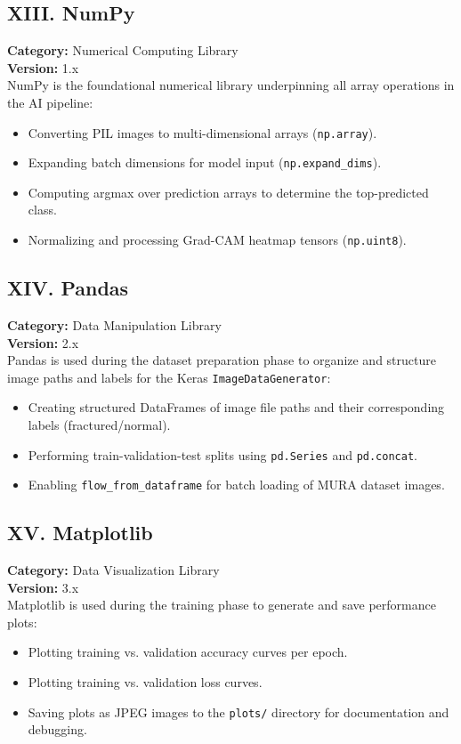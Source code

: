 \documentclass[a4paper,12pt]{report}
\begin{document}
    \subsection*{XIII. NumPy}
    \textbf{Category:} Numerical Computing Library\\
    \textbf{Version:} 1.x\\
    NumPy is the foundational numerical library underpinning all array operations in the AI pipeline:
    \begin{itemize}
        \item Converting PIL images to multi-dimensional arrays (\texttt{np.array}).
        \item Expanding batch dimensions for model input (\texttt{np.expand\_dims}).
        \item Computing argmax over prediction arrays to determine the top-predicted class.
        \item Normalizing and processing Grad-CAM heatmap tensors (\texttt{np.uint8}).
    \end{itemize}

    \subsection*{XIV. Pandas}
    \textbf{Category:} Data Manipulation Library\\
    \textbf{Version:} 2.x\\
    Pandas is used during the dataset preparation phase to organize and structure image paths and labels for the Keras \texttt{ImageDataGenerator}:
    \begin{itemize}
        \item Creating structured DataFrames of image file paths and their corresponding labels (fractured/normal).
        \item Performing train-validation-test splits using \texttt{pd.Series} and \texttt{pd.concat}.
        \item Enabling \texttt{flow\_from\_dataframe} for batch loading of MURA dataset images.
    \end{itemize}

    \subsection*{XV. Matplotlib}
    \textbf{Category:} Data Visualization Library\\
    \textbf{Version:} 3.x\\
    Matplotlib is used during the training phase to generate and save performance plots:
    \begin{itemize}
        \item Plotting training vs. validation accuracy curves per epoch.
        \item Plotting training vs. validation loss curves.
        \item Saving plots as JPEG images to the \texttt{plots/} directory for documentation and debugging.
    \end{itemize}
\end{document}
